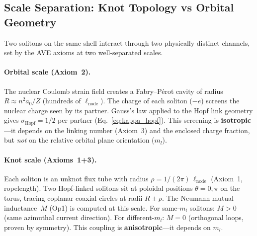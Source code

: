 \subsection{Scale Separation: Knot Topology vs Orbital Geometry}
\label{sec:scale_separation}

Two solitons on the same shell interact through two physically
distinct channels, set by the AVE axioms at two well-separated
scales.

\paragraph{Orbital scale (Axiom~2).}
The nuclear Coulomb strain field creates a Fabry--P\'{e}rot cavity
of radius $R \approx n^2 a_0 / Z$ (hundreds of $\ell_{\text{node}}$).
The charge of each soliton ($-e$) screens the nuclear charge seen
by its partner.  Gauss's law applied to the Hopf link geometry
gives $\sigma_{\text{Hopf}} = 1/2$ per partner
(Eq.~\ref{eq:kappa_hopf}).  This screening is
\textbf{isotropic}---it depends on the linking number (Axiom~3)
and the enclosed charge fraction, but \emph{not} on the relative
orbital plane orientation ($m_l$).

\paragraph{Knot scale (Axioms~1+3).}
Each soliton is an unknot flux tube with radius
$\rho = 1/(2\pi)\,\ell_{\text{node}}$ (Axiom~1, ropelength).
Two Hopf-linked solitons sit at poloidal positions
$\theta = 0, \pi$ on the torus, tracing coplanar coaxial
circles at radii $R \pm \rho$.
The Neumann mutual inductance~$M$ (Op1) is computed at
this scale.  For same-$m_l$ solitons: $M > 0$ (same
azimuthal current direction).  For different-$m_l$: $M = 0$
(orthogonal loops, proven by symmetry).  This coupling is
\textbf{anisotropic}---it depends on $m_l$.

